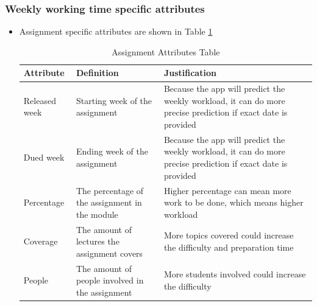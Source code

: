 \documentclass[fyp]{socreport}
\begin{document}
\subsubsection{Weekly working time specific attributes}
\begin{itemize}
	\item Assignment specific attributes are shown in Table {\ref{assignment-attribute}}
	\begin{table}[]
	\centering
	\begin{tabular}{|p{}|p{}|p{}|}
	\hline
		\rowcolor[HTML]{C0C0C0}
	  \textbf{Attribute} & \textbf{Definition} & \textbf{Justification} \\
	\hline
	Released week & Starting week of the assignment & Because the app will predict the weekly workload, it can do more precise prediction if exact date is provided \\
	\hline
	Dued week & Ending week of the assignment & Because the app will predict the weekly workload, it can do more precise prediction if exact date is provided \\
	\hline
	Percentage & The percentage of the assignment in the module & Higher percentage can mean more work to be done, which means higher workload \\
	\hline
	Coverage & The amount of lectures the assignment covers & More topics covered could increase the difficulty and preparation time \\
	\hline
	People & The amount of people involved in the assignment & More students involved could increase the difficulty \\
	\hline
	\end{tabular}
	\caption{Assignment Attributes Table}
	\label{assignment-attribute}
	\end{table}


\end{itemize}
\end{document}
